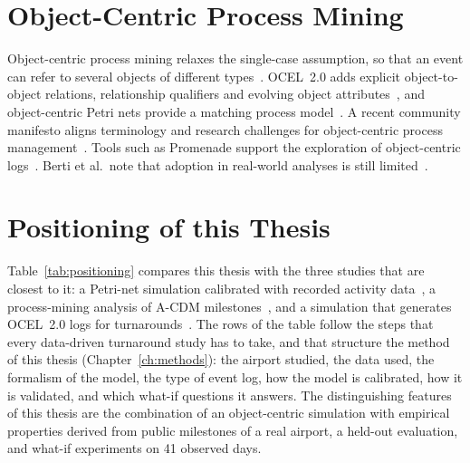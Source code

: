 \section{Object-Centric Process Mining}

Object-centric process mining relaxes the single-case assumption, so that an event can refer to several objects of different types~\cite{berti2023ocpmreview}. OCEL~2.0 adds explicit object-to-object relations, relationship qualifiers and evolving object attributes~\cite{koren2024ocel2,ocel2}, and object-centric Petri nets provide a matching process model~\cite{vanderaalst2020ocpn}. A recent community manifesto aligns terminology and research challenges for object-centric process management~\cite{seidel2026manifesto}. Tools such as Promenade support the exploration of object-centric logs~\cite{promenade}. Berti et al.\ note that adoption in real-world analyses is still limited~\cite{berti2023ocpmreview}.

\section{Positioning of this Thesis}

Table~\ref{tab:positioning} compares this thesis with the three studies that are closest to it: a Petri-net simulation calibrated with recorded activity data~\cite{sng2019petri}, a process-mining analysis of A-CDM milestones~\cite{rott2023processmining}, and a simulation that generates OCEL~2.0 logs for turnarounds~\cite{tkacenko2026}. The rows of the table follow the steps that every data-driven turnaround study has to take, and that structure the method of this thesis (Chapter~\ref{ch:methods}): the airport studied, the data used, the formalism of the model, the type of event log, how the model is calibrated, how it is validated, and which what-if questions it answers. The distinguishing features of this thesis are the combination of an object-centric simulation with empirical properties derived from public milestones of a real airport, a held-out evaluation, and what-if experiments on 41 observed days.

